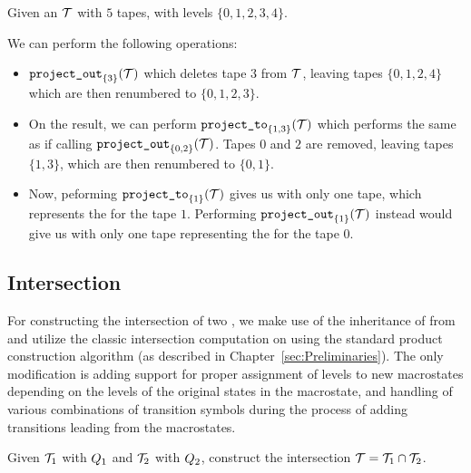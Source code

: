 \begin{example}
  Given an \nft $\mathcal{T}$ with $5$ tapes, with levels $\{ 0, 1, 2, 3, 4 \}$.

  We can perform the following operations:
  \begin{itemize}
    \item $\texttt{project\_out}_{\{ 3 \}}(\mathcal{T})$ which deletes tape $3$ from $\mathcal{T}$, leaving tapes $\{ 0, 1, 2, 4 \}$ which are then renumbered to $\{ 0, 1, 2, 3 \}$.
    \item On the result, we can perform $\texttt{project\_to}_{\{ 1, 3 \}}(\mathcal{T})$ which performs the same as if calling $\texttt{project\_out}_{\{ 0, 2 \} }(\mathcal{T})$.
    Tapes $0$ and $2$ are removed, leaving tapes $\{ 1, 3 \}$, which are then renumbered to $\{ 0, 1 \}$.
    \item Now, peforming $\texttt{project\_to}_{\{ 1 \}}(\mathcal{T})$ gives us \nft with only one tape, which represents the \nfa for the tape $1$.
    Performing $\texttt{project\_out}_{\{ 1 \}}(\mathcal{T})$ instead would give us \nft with only one tape representing the \nfa for the tape $0$.
  \end{itemize}

\end{example}

\subsection{Intersection}\label{sec:intersection}

For constructing the intersection of two \nfts, we make use of the inheritance of \nfts from \nfas and utilize the classic intersection computation on \nfa using the standard product construction algorithm (as described in Chapter~\ref{sec:Preliminaries}).
The only modification is adding support for proper assignment of levels to new macrostates depending on the levels of the original \nft states in the macrostate, and handling of various combinations of transition symbols during the process of adding transitions leading from the macrostates.

Given $\mathcal{T}_1$ with $Q_1$ and $\mathcal{T}_2$ with $Q_2$, construct the intersection $\mathcal{T} = \mathcal{T}_1 \cap \mathcal{T}_2$.

